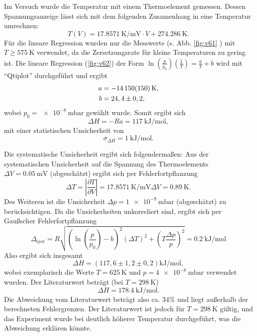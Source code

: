Im Versuch wurde die Temperatur mit einem Thermoelement gemessen. Dessen Spannungsanzeige lässt sich mit dem folgenden Zusamenhang in eine Temperatur umrechnen:
\begin{equation}
 T(V) = \SI{17,8571}{\kelvin\per\milli\volt} \cdot V + \SI{274,286}{\kelvin}.
\end{equation}
Für die lineare Regression wurden nur die Messwerte (s. Abb. \ref{fig:v61} ) mit $T\geq\SI{575}{\kelvin}$ verwendet, da die Zersetzungsrate für kleine Temperaturen zu gering ist. Die lineare Regression (\ref{fig:v62}) der Form $\ln\left(\frac{p}{p_{0}}\right)\left(\frac{1}{T}\right) = \frac{a}{T} + b$ wird mit ``Qtiplot'' durchgeführt und ergibt
\begin{align}
 a &= -\SI{14150\pm150}{\kelvin}, \\
 b &= 24,4 \pm 0,2,
\end{align}
wobei $p_{0}=\SI{e-8}{\milli\bar}$ gewählt wurde. Somit ergibt sich
\begin{equation}
 \Delta H = -Ra = \SI{117}{\kilo\joule\per\mol},
\end{equation}
mit einer statistischen Unsicherheit von
\begin{equation}
 \sigma_{\Delta H} = \SI{1}{\kilo\joule\per\mol}.
\end{equation}

Die systematische Unsicherheit ergibt sich folgendermaßen: Aus der systematischen Unsicherheit auf die Spannung des Thermoelements $\Delta V=\SI{0,05}{\milli\volt}$ (abgeschätzt) ergibt sich per Fehlerfortpflanzung
\begin{equation}
 \Delta T = \left| \frac{\partial T}{\partial V}\right| = \SI{17,8571}{\kelvin\per\milli\volt} \Delta V = \SI{0,89}{\kelvin}.
\end{equation}
Des Weiteren ist die Unsicherheit $\Delta p=\SI{1e-9}{\milli\bar}$ (abgeschätzt) zu berücksichtigen. Da die Unsicherheiten unkorreliert sind, ergibt sich per Gaußscher Fehlerfortpflanzung
\begin{equation}
 \Delta_{\textrm{syst}} = R \sqrt{\left(\ln\left(\frac{p}{p_{0}}\right)-b\right)^{2}\left(\Delta T\right)^{2} + \left(T\frac{\Delta p}{p}\right)^{2}} = \SI{0,2}{\kilo\joule\per\mol}
\end{equation}
Also ergibt sich insgesamt
\begin{equation}
 \Delta H = (117,6\pm1,2\pm0,2)\si{\kilo\joule\per\mole},
\end{equation}
wobei exemplarisch die Werte $T=\SI{625}{\kelvin}$ und $p=\SI{4e-8}{\milli\bar}$ verwendet wurden.
Der Literaturwert beträgt (bei $T=\SI{298}{\kelvin}$) \cite{chem}
\begin{equation}
 \Delta H = \SI{178,4}{\kilo\joule\per\mole}.
\end{equation}
Die Abweichung vom Literaturwert beträgt also ca. $34\%$ und liegt außerhalb der berechneten Fehlergrenzen. Der Literaturwert ist jedoch für $T=\SI{298}{\kelvin}$ gültig, und das Experiment wurde bei deutlich höherer Temperatur durchgeführt, was die Abweichung erklären könnte.



